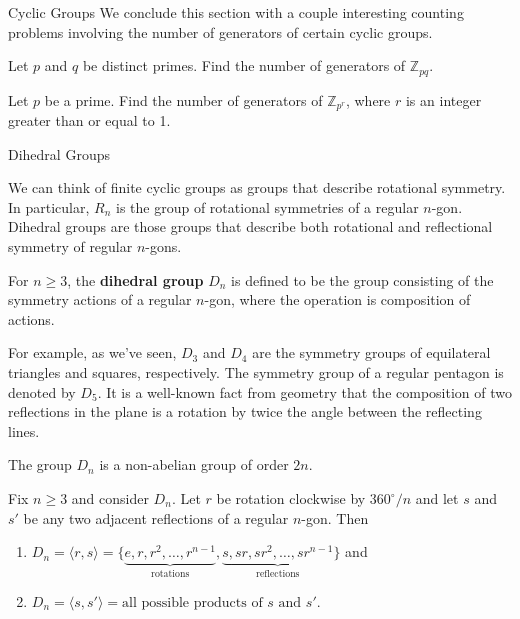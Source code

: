\begin{section}{Cyclic Groups}
We conclude this section with a couple interesting counting problems involving the number of generators of certain cyclic groups.

\begin{problem}
Let $p$ and $q$ be distinct primes. Find the number of generators of $\mathbb{Z}_{pq}$.
\end{problem}

\begin{problem}
Let $p$ be a prime. Find the number of generators of $\mathbb{Z}_{p^r}$, where $r$ is an integer greater than or equal to 1.
\end{problem}

\end{section}

\begin{section}{Dihedral Groups}

We can think of finite cyclic groups as groups that describe rotational symmetry.  In particular, $R_n$ is the group of rotational symmetries of a regular $n$-gon.  Dihedral groups are those groups that describe both rotational and reflectional symmetry of regular $n$-gons.

\begin{definition}\label{def:dihedral}
For $n\geq 3$, the \textbf{dihedral group} $D_n$ is defined to be the group consisting of the symmetry actions of a regular $n$-gon, where the operation is composition of actions.
\end{definition}

For example, as we've seen, $D_3$ and $D_4$ are the symmetry groups of equilateral triangles and squares, respectively.  The symmetry group of a regular pentagon is denoted by $D_5$.  It is a well-known fact from geometry that the composition of two reflections in the plane is a rotation by twice the angle between the reflecting lines.

\begin{theorem}
The group $D_n$ is a non-abelian group of order $2n$.
\end{theorem}

\begin{theorem}\label{thm:generators_Dn}
Fix $n\geq 3$ and consider $D_n$. Let $r$ be rotation clockwise by $360^{\circ}/n$  and let $s$ and $s'$ be any two adjacent reflections of a regular $n$-gon.  Then
\begin{enumerate}[label=\rm{(\alph*)}]
\item $D_n=\langle r,s\rangle =\{\underbrace{e,r,r^2,\ldots, r^{n-1}}_{\text{rotations}},\underbrace{s,sr,sr^2,\ldots,sr^{n-1}}_{\text{reflections}}\}$ and
\item $D_n=\langle s,s'\rangle = \text{all possible products of }s\text{ and }s'$.
\end{enumerate}
\end{theorem}


\end{section}
